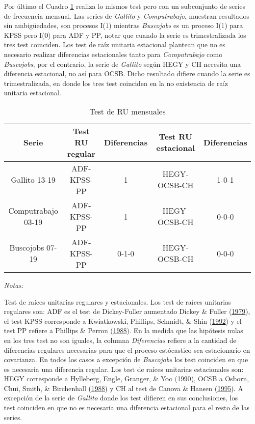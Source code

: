 \documentclass[12pt,oneside]{reedthesis}
\begin{document}
Por último el Cuadro \ref{tab:test-ru-mensual} realiza lo mismos test pero con un subconjunto de series de frecuencia mensual. Las series de \emph{Gallito} y \emph{Computrabajo}, muestran resultados sin ambigüedades, son procesos I(1) mientras \emph{Buscojobs} es un proceso I(1) para KPSS pero I(0) para ADF y PP, notar que cuando la serie es trimestralizada los tres test coinciden. Los test de raíz unitaria estacional plantean que no es necesario realizar diferencias estacionales tanto para \emph{Computrabajo} como \emph{Buscojobs}, por el contrario, la serie de \emph{Gallito} según HEGY y CH necesita una diferencia estacional, no así para OCSB. Dicho resultado difiere cuando la serie es trimestralizada, en donde los tres test coinciden en la no existencia de raíz unitaria estacional.
\begin{table}

\caption{\label{tab:test-ru-mensual}Test de RU mensuales}
\centering
\begin{threeparttable}
\begin{tabular}[t]{ccccc}
\toprule
Serie & Test RU regular & Diferencias & Test RU estacional & Diferencias\\
\midrule
Gallito 13-19 & ADF-KPSS-PP & 1 & HEGY-OCSB-CH & 1-0-1\\
Computrabajo 03-19 & ADF-KPSS-PP & 1 & HEGY-OCSB-CH & 0-0-0\\
Buscojobs 07-19 & ADF-KPSS-PP & 0-1-0 & HEGY-OCSB-CH & 0-0-0\\
\bottomrule
\end{tabular}
\begin{tablenotes}
\item \textit{Notas:} 
\item \footnotesize Test de raíces unitarias regulares y estacionales. Los test de raíces unitarias regulares son: ADF es el test de Dickey-Fuller aumentado Dickey \& Fuller (\protect\hyperlink{ref-DickeyFuller1979}{1979}), el test KPSS corresponde a Kwiatkowski, Phillips, Schmidt, \& Shin (\protect\hyperlink{ref-KPSS1992}{1992}) y el test PP refiere a Phillips \& Perron (\protect\hyperlink{ref-PhillipsPerron1988}{1988}). En la medida que las hipótesis nulas en los tres test no son iguales, la columna \textit{Diferencias} refiere a la cantidad de diferencias regulares necesarias para que el proceso estócastico sea estacionario en covarianza. En todos los casos a excepción de \textit{Buscojobs} los test coinciden en que es necesaria una diferencia regular. Los test de raíces unitarias estacionales son: HEGY corresponde a Hylleberg, Engle, Granger, \& Yoo (\protect\hyperlink{ref-hegy1990}{1990}), OCSB a Osborn, Chui, Smith, \& Birchenhall (\protect\hyperlink{ref-Osborn1988}{1988}) y CH al test de Canova \& Hansen (\protect\hyperlink{ref-Canova1995}{1995}). A excepción de la serie de \textit{Gallito} donde los test difieren en sus conclusiones, los test coinciden en que no es necesaria una diferencia estacional para el resto de las series. 


\end{tablenotes}
\end{threeparttable}
\end{table}
\end{document}
